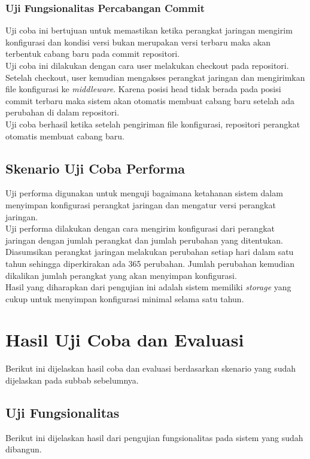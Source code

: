     	\subsubsection{Uji Fungsionalitas Percabangan Commit}
    	Uji coba ini bertujuan untuk memastikan ketika perangkat jaringan mengirim konfigurasi dan kondisi versi bukan merupakan versi terbaru maka akan terbentuk cabang baru pada commit repositori.\\
    	\indent Uji coba ini dilakukan dengan cara user melakukan checkout pada repositori. Setelah checkout, user kemudian mengakses perangkat jaringan dan mengirimkan file konfigurasi ke \textit{middleware}. Karena posisi head tidak berada pada posisi commit terbaru maka sistem akan otomatis membuat cabang baru setelah ada perubahan di dalam repositori.\\
    	\indent Uji coba berhasil ketika setelah pengiriman file konfigurasi, repositori perangkat otomatis membuat cabang baru.
    	 
    \subsection{Skenario Uji Coba Performa}
    	Uji performa digunakan untuk menguji bagaimana ketahanan sistem dalam menyimpan konfigurasi perangkat jaringan dan mengatur versi perangkat jaringan.\\
    	\indent Uji performa dilakukan dengan cara mengirim konfigurasi dari perangkat jaringan dengan jumlah perangkat dan jumlah perubahan yang ditentukan. Diasumsikan perangkat jaringan melakukan perubahan setiap hari dalam satu tahun sehingga diperkirakan ada 365 perubahan. Jumlah perubahan kemudian dikalikan jumlah perangkat yang akan menyimpan konfigurasi. \\
    	\indent Hasil yang diharapkan dari pengujian ini adalah sistem memiliki \textit{storage} yang cukup untuk menyimpan konfigurasi minimal selama satu tahun. 
    
\section{Hasil Uji Coba dan Evaluasi}
	Berikut ini dijelaskan hasil coba dan evaluasi berdasarkan skenario yang sudah dijelaskan pada subbab sebelumnya.
	
	\subsection{Uji Fungsionalitas}
	Berikut ini dijelaskan hasil dari pengujian fungsionalitas pada sistem yang sudah dibangun.
	
